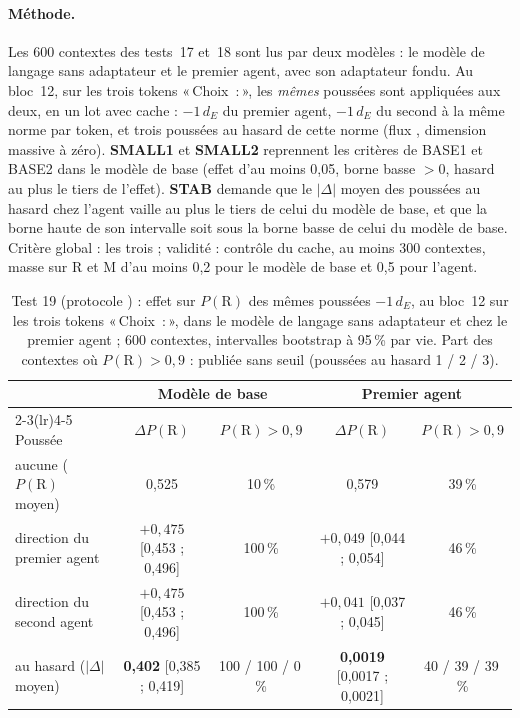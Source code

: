\documentclass[11pt,a4paper]{article}
\newcommand{\Choix}{«\,Choix~:\,»}
\newcommand{\dE}{d_{E}}
\newcommand{\code}[1]{\texttt{\detokenize{#1}}}
\begin{document}
\paragraph{Méthode.} Les 600 contextes des tests~17 et~18 sont lus par deux modèles : le modèle
de langage sans adaptateur et le premier agent, avec son adaptateur fondu. Au bloc~12, sur les
trois tokens \Choix{}, les \emph{mêmes} poussées sont appliquées aux deux, en un lot avec
cache : $-1\,\dE$ du premier agent, $-1\,\dE$ du second à la même norme par token, et trois
poussées au hasard de cette norme (flux \code{[270926, 39, i]}, dimension massive à zéro).
\textbf{SMALL1} et \textbf{SMALL2} reprennent les critères de BASE1 et BASE2 dans le modèle de
base (effet d'au moins 0,05, borne basse $>0$, hasard au plus le tiers de l'effet).
\textbf{STAB} demande que le $|\Delta|$ moyen des poussées au hasard chez l'agent vaille au plus
le tiers de celui du modèle de base, et que la borne haute de son intervalle soit sous la borne
basse de celui du modèle de base. Critère global : les trois ; validité : contrôle du cache, au
moins 300 contextes, masse sur R et M d'au moins 0,2 pour le modèle de base et 0,5 pour l'agent.

\begin{table}[t]
\centering
\caption{Test 19 (protocole \code{0bf15d0}) : effet sur $P(\mathrm R)$ des mêmes poussées
$-1\,\dE$, au bloc~12 sur les trois tokens \Choix{}, dans le modèle de langage sans adaptateur
et chez le premier agent ; 600 contextes, intervalles bootstrap à 95\,\% par vie. Part des
contextes où $P(\mathrm R)>0,9$ : publiée sans seuil (poussées au hasard 1 / 2 / 3).}
\label{tab-t19}
\small
\setlength{\tabcolsep}{4pt}
\begin{tabular}{@{}l cc cc@{}}
\toprule
& \multicolumn{2}{c}{Modèle de base} & \multicolumn{2}{c}{Premier agent} \\
\cmidrule(lr){2-3}\cmidrule(lr){4-5}
Poussée & $\Delta P(\mathrm R)$ & $P(\mathrm R)>0,9$ & $\Delta P(\mathrm R)$ & $P(\mathrm R)>0,9$ \\
\midrule
aucune ($P(\mathrm R)$ moyen) & 0,525 & 10\,\% & 0,579 & 39\,\% \\
direction du premier agent & $+0,475$ [0,453 ; 0,496] & 100\,\% & $+0,049$ [0,044 ; 0,054] & 46\,\% \\
direction du second agent & $+0,475$ [0,453 ; 0,496] & 100\,\% & $+0,041$ [0,037 ; 0,045] & 46\,\% \\
au hasard ($|\Delta|$ moyen) & \textbf{0,402} [0,385 ; 0,419] & 100 / 100 / 0\,\% & \textbf{0,0019} [0,0017 ; 0,0021] & 40 / 39 / 39\,\% \\
\bottomrule
\end{tabular}
\end{table}
\end{document}
